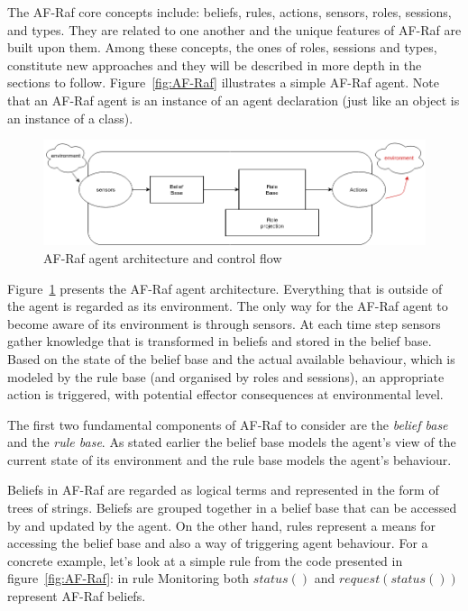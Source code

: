 \documentclass[a4paper,12pt,oneside,fleqn]{book} %
\begin{document}
The AF-Raf core concepts include: beliefs, rules, actions, sensors, roles,
sessions, and types. They are related to one another and the unique
features of AF-Raf are built upon them. Among these concepts, the ones of
roles, sessions and types, constitute new approaches and they will be
described in more depth in the sections to follow. Figure~\ref{fig:AF-Raf}
illustrates a simple AF-Raf agent. Note that an AF-Raf agent is an instance
of an agent declaration (just like an object is an instance of a class).

\begin{figure}\footnotesize %
\includegraphics{AF-RafArchitecture2.png}
\caption{AF-Raf agent architecture and control flow}
\label{fig:AF-RafArch}
\end{figure} %

Figure~\ref{fig:AF-RafArch} presents the AF-Raf agent architecture.
Everything that is outside of the agent is regarded as its environment. The
only way for the AF-Raf agent to become aware of its environment is through
sensors. At each time step sensors gather knowledge that is transformed in
beliefs and stored in the belief base. Based on the state of the belief
base and the actual available behaviour, which is modeled by the rule base
(and organised by roles and sessions), an appropriate action is triggered,
with potential effector consequences at environmental level.

The first two fundamental components of AF-Raf to consider are the
\textit{belief base} and the \textit{rule base}. As stated earlier the
belief base models the agent's view of the current state of its environment
and the rule base models the agent's behaviour.

Beliefs in AF-Raf are regarded as logical terms and represented in the form
of trees of strings. Beliefs are grouped together in a belief base that can
be accessed by and updated by the agent. On the other hand, rules represent
a means for accessing the belief base and also a way of triggering agent
behaviour. For a concrete example, let's look at a simple rule from the
code presented in figure~\ref{fig:AF-Raf}: in rule Monitoring both
$status()$ and $request(status())$ represent AF-Raf beliefs.
\end{document}
